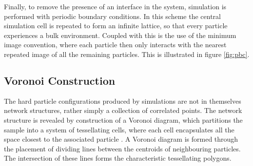 Finally, to remove the presence of an interface in the system, simulation is performed with periodic boundary conditions.
In this scheme the central simulation cell is repeated to form an infinite lattice, so that every particle experiences a bulk environment.
Coupled with this is the use of the minimum image convention, where each particle then only interacts with the nearest repeated image of all the remaining particles.
This is illustrated in figure \ref{fig:pbc}.
 
\subsection{Voronoi Construction}
\label{ssec:voronoi}


The hard particle configurations produced by \mc{} simulations are not in themselves network structures, rather simply a collection of correlated points.
The network structure is revealed by construction of a Voronoi diagram, which partitions the sample into a system of tessellating cells, where each cell encapsulates all the space closest to the associated particle \cite{Okabe1992}.
A \td{} Voronoi diagram is formed through the placement of dividing lines between the centroids of neighbouring particles. 
The intersection of these lines forms the characteristic tessellating polygons.

